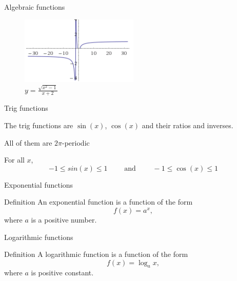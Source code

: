 \documentclass[t]{beamer}
\newenvironment{fpi}
  {\itemize[nolistsep,itemsep=\fill]}
  {\vfill\enditemize}
\begin{document}
\begin{frame}{Algebraic functions}
\begin{figure}
\vfill
\includegraphics[width=0.5\textwidth]{algebraic}
\caption{$\displaystyle y = \frac{\sqrt{x^2 -1}}{x + 2}$}
\end{figure}
\vfill
\end{frame}

\begin{frame}{Trig functions}
\begin{fpi}
\item The trig functions are $\sin(x)$, $ \cos(x)$ and their ratios and inverses.
\item All of them are $2\pi$-periodic
\item For all $x$,
$$-1 \le sin(x) \le 1 \qquad \text{ and }\qquad -1 \le \cos(x) \le 1$$
\end{fpi}
\end{frame}


\begin{frame}{Exponential functions}
\begin{block}{Definition}
An exponential function is a function of the form
$$ f(x) = a^x,$$
where $a$ is a positive number.
\end{block}
\end{frame}

\begin{frame}{Logarithmic functions}
\begin{block}{Definition}
A logarithmic function is a function of the form
$$ f(x) = \log_a x,$$
where $a$ is positive constant.
\end{block}
\end{frame}
\end{document}
